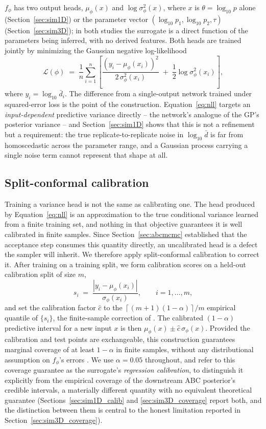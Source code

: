 \documentclass[sn-basic,iicol,pdflatex]{sn-jnl}
\newcommand{\dbar}{\ensuremath{\bar d}}
\begin{document}
$f_\phi$ has two output heads, $\mu_\phi(x)$ and $\log\sigma^2_\phi(x)$, where
$x$ is $\theta=\log_{10}p$ alone (Section~\ref{sec:sim1D}) or the parameter
vector $(\log_{10}p_1, \log_{10}p_2, \tau)$ (Section~\ref{sec:sim3D}); in
both studies the surrogate is a direct function of the parameters being
inferred, with no derived features. Both heads are trained
jointly by minimizing the Gaussian negative log-likelihood
\begin{equation}
\label{eq:nll}
\mathcal{L}(\phi) \;=\; \frac{1}{n}\sum_{i=1}^n \left[
\frac{\left(y_i - \mu_\phi(x_i)\right)^2}{2\,\sigma_\phi^2(x_i)}
\;+\; \frac{1}{2}\log \sigma_\phi^2(x_i)
\right],
\end{equation}
where $y_i = \log_{10}\dbar_i$. The difference from a single-output network
trained under squared-error loss is the point of the construction. Equation~\ref{eq:nll}
targets an \emph{input-dependent} predictive variance directly -- the network's
analogue of the GP's posterior variance -- and Section~\ref{sec:sim1D} shows
that this is not a refinement but a requirement: the true
replicate-to-replicate noise in $\log_{10}\dbar$ is far from homoscedastic
across the parameter range, and a Gaussian process carrying a single noise term
cannot represent that shape at all.

\subsection{Split-conformal calibration}
\label{sec:conformal}

Training a variance head is not the same as calibrating one. The head produced
by Equation~\ref{eq:nll} is an approximation to the true conditional variance
learned from a finite training set, and nothing in that objective guarantees it
is well calibrated in finite samples. Since Section~\ref{sec:abcmcmc} established
that the acceptance step consumes this quantity directly, an uncalibrated head is
a defect the sampler will inherit. We therefore apply split-conformal calibration
\citep{lei2018} to correct it. After training on a training split, we form
calibration scores on a held-out calibration split of size $m$,
\[
s_i \;=\; \frac{\left|y_i - \mu_\phi(x_i)\right|}{\sigma_\phi(x_i)}, \qquad i=1,\dots,m,
\]
and set the calibration factor $\hat c$ to the $\left\lceil (m+1)(1-\alpha)
\right\rceil / m$ empirical quantile of $\{s_i\}$, the finite-sample
correction of \citet{lei2018}. The calibrated $(1-\alpha)$ predictive interval
for a new input $x$ is then $\mu_\phi(x) \pm \hat c\, \sigma_\phi(x)$. Provided
the calibration and test points are exchangeable, this construction guarantees
marginal coverage of at least $1-\alpha$ in finite samples, without any
distributional assumption on $f_\phi$'s errors \citep{lei2018}. We use
$\alpha = 0.05$ throughout, and refer to this coverage guarantee as the
surrogate's \emph{regression calibration}, to distinguish it explicitly
from the empirical coverage of the downstream ABC posterior's credible
intervals, a materially different quantity with no equivalent theoretical
guarantee (Sections~\ref{sec:sim1D_calib} and \ref{sec:sim3D_coverage}
report both, and the distinction between them is central to the honest
limitation reported in Section~\ref{sec:sim3D_coverage}).
\end{document}
